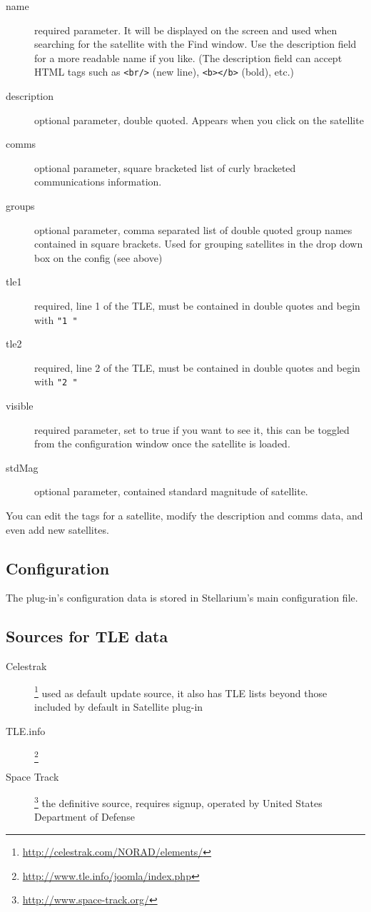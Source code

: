 \begin{description}
\item[name] required parameter. It will be displayed on the screen and used
when searching for the satellite with the Find window. Use the
description field for a more readable name if you like. (The
description field can accept HTML tags such as \texttt{<br/>} (new line), \texttt{<b></b>} (bold), etc.)

\item[description] optional parameter, double quoted. Appears when you click on the satellite \item[comms] optional parameter, square bracketed list of curly bracketed communications information.
\item[groups]  optional parameter, comma separated list of double quoted group names contained in square brackets. Used for grouping satellites in the drop down box on the config (see above)
\item[tle1]  required, line 1 of the TLE, must be contained in double quotes and begin with \texttt{"1~"}
\item[tle2]  required, line 2 of the TLE, must be contained in double quotes and begin with \texttt{"2~"}
\item[visible]  required parameter, set to true if you want to see it, this can be toggled from the configuration window once the satellite is loaded. 
\item[stdMag]  optional parameter, contained standard magnitude of satellite. 
\end{description}
You can edit the tags for a satellite, modify the description and comms data, and even add new satellites. 

\subsection{Configuration}

The plug-in's configuration data is stored in Stellarium's main configuration
file.


\subsection{Sources for TLE data}

\begin{description}
\item[Celestrak]\footnote{\url{http://celestrak.com/NORAD/elements/}} used as default update source, it also has TLE lists
  beyond those included by default in Satellite plug-in
\item[TLE.info]\footnote{\url{http://www.tle.info/joomla/index.php}}
\item[Space Track]\footnote{\url{http://www.space-track.org/}} the definitive source, requires signup, operated by
  United States Department of Defense
\end{description}


